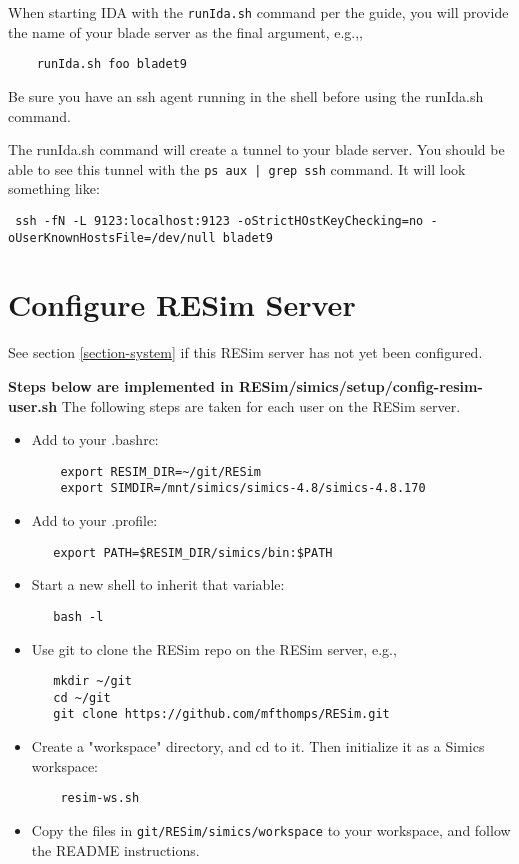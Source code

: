 \documentclass[titlepage]{article}
\begin{document}
When starting IDA with the {\tt runIda.sh} command per the guide, you will provide the
name of your blade server as the final argument, e.g.,,
\begin{verbatim}
    runIda.sh foo bladet9
\end{verbatim}
\noindent Be sure you have an ssh agent running in the shell before using the runIda.sh command.

The runIda.sh command will create a tunnel to your blade server.  You should be able to see this tunnel
with the {\tt ps aux | grep ssh} command.  It will look something like:
\begin{verbatim}
 ssh -fN -L 9123:localhost:9123 -oStrictHOstKeyChecking=no -oUserKnownHostsFile=/dev/null bladet9
\end{verbatim}


\section{Configure RESim Server}
See section \ref{section-system} if this RESim server has not yet been configured.

\textbf{Steps below are implemented in RESim/simics/setup/config-resim-user.sh}
The following steps are taken for each user on the RESim server.
\begin{itemize}

\item Add to your .bashrc:
\begin{verbatim}
    export RESIM_DIR=~/git/RESim
    export SIMDIR=/mnt/simics/simics-4.8/simics-4.8.170
\end{verbatim}
\item Add to your .profile:
\begin{verbatim}
   export PATH=$RESIM_DIR/simics/bin:$PATH
\end{verbatim}

\item Start a new shell to inherit that variable:
\begin{verbatim}
   bash -l
\end{verbatim}

\item Use git to clone the RESim repo on the RESim server, e.g., 
\begin{verbatim}
   mkdir ~/git
   cd ~/git
   git clone https://github.com/mfthomps/RESim.git
\end{verbatim}

\item Create a "workspace" directory, and cd to it.  Then initialize
it as a Simics workspace:
\begin{verbatim}
    resim-ws.sh
\end{verbatim}

\item Copy the files in {\tt git/RESim/simics/workspace} to your workspace, and follow the README instructions.
\end{itemize}
\end{document}
